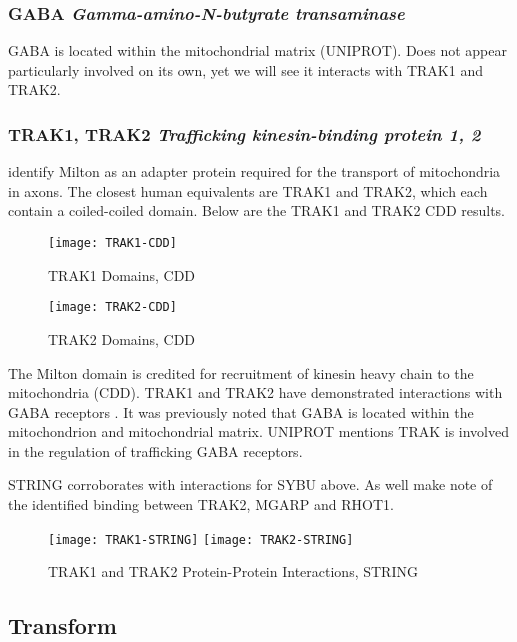 \subsubsection{GABA \textit{Gamma-amino-N-butyrate transaminase}}

GABA is located within the mitochondrial matrix (UNIPROT). Does not appear
particularly involved on its own, yet we will see it interacts with TRAK1 and
TRAK2.

\subsubsection{TRAK1, TRAK2 \textit{Trafficking kinesin-binding protein 1, 2}}

\cite{Reis2009} identify Milton as an adapter protein required for the
transport of mitochondria in axons.  The closest human equivalents are TRAK1
and TRAK2, which each contain a coiled-coiled domain. Below are the TRAK1 and
TRAK2 CDD results.

\begin{figure}[h!]
  \texttt{[image: TRAK1-CDD]}
  \caption{TRAK1 Domains, CDD}
\end{figure}

\begin{figure}[h!]
  \texttt{[image: TRAK2-CDD]}
  \caption{TRAK2 Domains, CDD}
\end{figure}

The Milton domain is credited for recruitment of kinesin heavy chain to the
mitochondria (CDD). TRAK1 and TRAK2 have demonstrated interactions with
GABA receptors \citep{Resi2009}. It was previously noted that GABA is located
within the mitochondrion and mitochondrial matrix. UNIPROT mentions TRAK is
involved in the regulation of trafficking GABA receptors.

STRING corroborates with interactions for SYBU above. As well make note of the
identified binding between TRAK2, MGARP and RHOT1.

\begin{figure}[h!]
  \texttt{[image: TRAK1-STRING]}
  \texttt{[image: TRAK2-STRING]}
  \caption{TRAK1 and TRAK2 Protein-Protein Interactions, STRING}
\end{figure}

\subsection{Transform}

